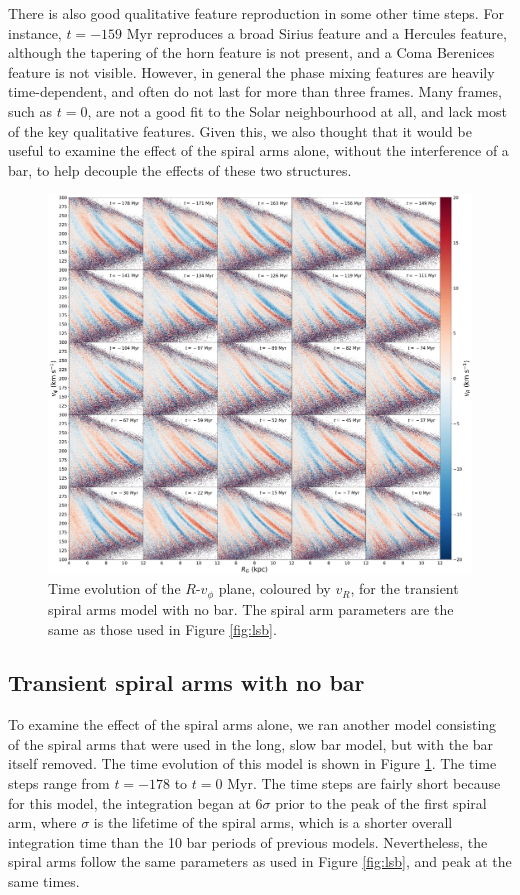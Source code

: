 \documentclass[10pt]{article}
\begin{document}
There is also good qualitative feature reproduction in some other time steps. For instance, $t = -159$ Myr reproduces a broad Sirius feature and a Hercules feature, although the tapering of the horn feature is not present, and a Coma Berenices feature is not visible. However, in general the phase mixing features are heavily time-dependent, and often do not last for more than three frames. Many frames, such as $t = 0$, are not a good fit to the Solar neighbourhood at all, and lack most of the key qualitative features. Given this, we also thought that it would be useful to examine the effect of the spiral arms alone, without the interference of a bar, to help decouple the effects of these two structures.

\begin{figure}[h]
    \centering
    \includegraphics[width=\textwidth]{plots/three_spirals_no_bar_RvT_vR.pdf}
    \caption{Time evolution of the $R$-$v_\phi$ plane, coloured by $v_R$, for the transient spiral arms model with no bar. The spiral arm parameters are the same as those used in Figure \ref{fig:lsb}.}
    \label{fig:no-bar}
\end{figure}

\subsection{Transient spiral arms with no bar}
To examine the effect of the spiral arms alone, we ran another model consisting of the spiral arms that were used in the long, slow bar model, but with the bar itself removed. The time evolution of this model is shown in Figure \ref{fig:no-bar}. The time steps range from $t = -178$ to $t = 0$ Myr. The time steps are fairly short because for this model, the integration began at $6 \sigma$ prior to the peak of the first spiral arm, where $\sigma$ is the lifetime of the spiral arms, which is a shorter overall integration time than the 10 bar periods of previous models. Nevertheless, the spiral arms follow the same parameters as used in Figure \ref{fig:lsb}, and peak at the same times. 
\end{document}

